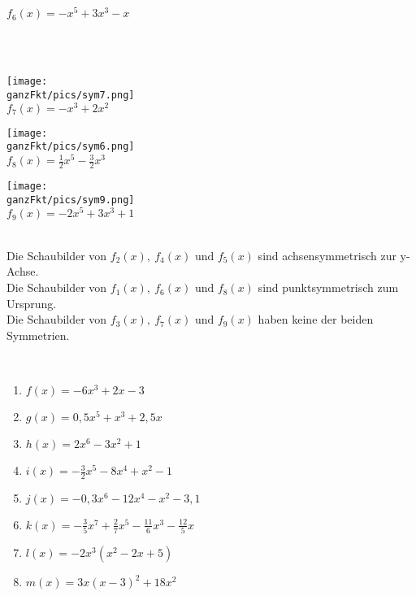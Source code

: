 \begin{minipage}{\textwidth}
\begin{minipage}{0.32\textwidth}
		\(f_6(x)=-x^5+3x^3-x\)
	\end{minipage}\\ \vspace{0.3cm}\\
	\begin{minipage}{0.32\textwidth}\centering
		\texttt{[image: \\ganzFkt/pics/sym7.png]}\\
		\(f_7(x)=-x^3+2x^2\)
	\end{minipage}
	\begin{minipage}{0.32\textwidth}\centering
		\texttt{[image: \\ganzFkt/pics/sym6.png]}\\
		\(f_8(x)=\frac{1}{2}x^5-\frac{3}{2}x^3\)
	\end{minipage}
	\begin{minipage}{0.32\textwidth}\centering
		\texttt{[image: \\ganzFkt/pics/sym9.png]}\\
		\(f_9(x)=-2x^5+3x^3+1\)
	\end{minipage}
\end{minipage}\\
\textcolor{loes}{Die Schaubilder von \(f_2(x),\ f_4(x)\text{ und } f_5(x)\) sind achsensymmetrisch zur y-Achse.}\\
\textcolor{loes}{Die Schaubilder von \(f_1(x),\ f_6(x)\text{ und } f_8(x)\) sind punktsymmetrisch zum Ursprung.}\\
\textcolor{loes}{Die Schaubilder von \(f_3(x),\ f_7(x)\text{ und } f_9(x)\) haben keine der beiden Symmetrien.}
\newpage
\begin{Exercise}[title={Untersuche auf Symmetrie}, label=ganzSymA1]\\
	\begin{minipage}{\textwidth}
		\begin{minipage}{0.49\textwidth}
			\begin{enumerate}[label=\alph*)]
				\item \(f(x)=-6x^3+2x-3\)
				\item \(g(x)=0,5x^5+x^3+2,5x\)
				\item \(h(x)=2x^6-3x^2+1\)
				\item \(i(x)=-\frac{3}{2}x^5-8x^4+x^2-1\)
			\end{enumerate}
		\end{minipage}
		\begin{minipage}{0.49\textwidth}
			\begin{enumerate}[label=\alph*)]
				\setcounter{enumi}{4}
				\item \(j(x)=-0,3x^6-12x^4-x^2-3,1\)
				\item \(k(x)=-\frac{3}{5}x^7+\frac{2}{7}x^5-\frac{11}{6}x^3-\frac{12}{5}x\)
				\item \(l(x)=-2x^3\left(x^2-2x+5\right)\)
				\item \(m(x)=3x\left(x-3\right)^2+18x^2\)
			\end{enumerate}
		\end{minipage}
	\end{minipage}
\end{Exercise}
